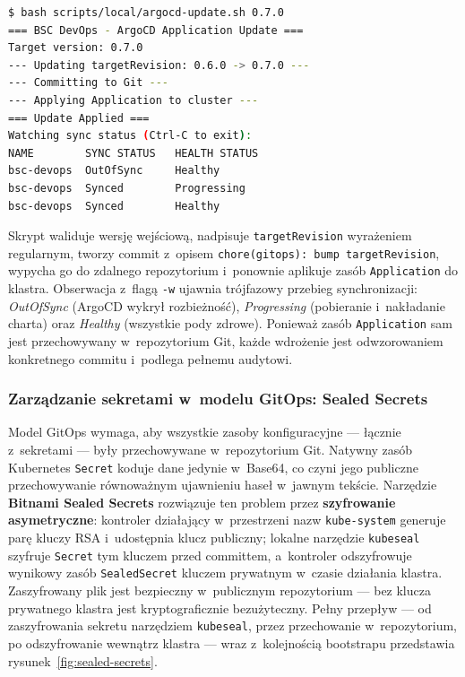 \begin{lstlisting}[language=bash, caption={Aktualizacja \texttt{targetRevision} i~ponowne załadowanie zasobu \texttt{Application} do klastra (scripts/local/argocd-update.sh)}, label={lst:argocd-update}]
$ bash scripts/local/argocd-update.sh 0.7.0
=== BSC DevOps - ArgoCD Application Update ===
Target version: 0.7.0
--- Updating targetRevision: 0.6.0 -> 0.7.0 ---
--- Committing to Git ---
--- Applying Application to cluster ---
=== Update Applied ===
Watching sync status (Ctrl-C to exit):
NAME        SYNC STATUS   HEALTH STATUS
bsc-devops  OutOfSync     Healthy
bsc-devops  Synced        Progressing
bsc-devops  Synced        Healthy
\end{lstlisting}

Skrypt waliduje wersję wejściową, nadpisuje \texttt{targetRevision} wyrażeniem regularnym, tworzy commit z~opisem \texttt{chore(gitops): bump targetRevision}, wypycha go do zdalnego repozytorium i~ponownie aplikuje zasób \texttt{Application} do klastra. Obserwacja z~flagą \texttt{-w} ujawnia trójfazowy przebieg synchronizacji: \textit{OutOfSync} (ArgoCD wykrył rozbieżność), \textit{Progressing} (pobieranie i~nakładanie charta) oraz \textit{Healthy} (wszystkie pody zdrowe). Ponieważ zasób \texttt{Application} sam jest przechowywany w~repozytorium Git, każde wdrożenie jest odwzorowaniem konkretnego commitu i~podlega pełnemu audytowi.

\subsubsection{Zarządzanie sekretami w~modelu GitOps: Sealed Secrets}
Model GitOps wymaga, aby wszystkie zasoby konfiguracyjne --- łącznie z~sekretami --- były przechowywane w~repozytorium Git. Natywny zasób Kubernetes \texttt{Secret} koduje dane jedynie w~Base64, co czyni jego publiczne przechowywanie równoważnym ujawnieniu haseł w~jawnym tekście. Narzędzie \textbf{Bitnami Sealed Secrets} rozwiązuje ten problem przez \textbf{szyfrowanie asymetryczne}: kontroler działający w~przestrzeni nazw \texttt{kube-system} generuje parę kluczy RSA i~udostępnia klucz publiczny; lokalne narzędzie \texttt{kubeseal} szyfruje \texttt{Secret} tym kluczem przed committem, a~kontroler odszyfrowuje wynikowy zasób \texttt{SealedSecret} kluczem prywatnym w~czasie działania klastra. Zaszyfrowany plik jest bezpieczny w~publicznym repozytorium --- bez klucza prywatnego klastra jest kryptograficznie bezużyteczny.
Pełny przepływ --- od zaszyfrowania sekretu narzędziem \texttt{kubeseal}, przez przechowanie w~repozytorium, po odszyfrowanie wewnątrz klastra --- wraz z~kolejnością bootstrapu przedstawia rysunek~\ref{fig:sealed-secrets}.

